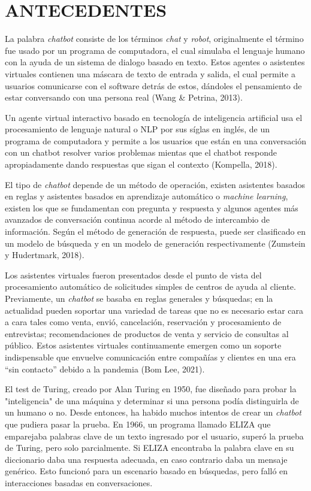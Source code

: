 \documentclass[letter, openright, 12pt]{book}
\begin{document}
\section{ANTECEDENTES}
La palabra \textit{chatbot} consiste de los términos \textit{chat} y \textit{robot}, originalmente el término fue usado por un programa de computadora, el cual simulaba el lenguaje humano con la ayuda de un sistema de dialogo basado en texto. Estos agentes o asistentes virtuales contienen una máscara de texto de entrada y salida, el cual permite a usuarios comunicarse con el software detrás de estos, dándoles el pensamiento de estar conversando con una persona real (Wang \& Petrina, 2013).\par 
Un agente virtual interactivo basado en tecnología de inteligencia artificial usa el procesamiento de lenguaje natural o NLP por sus síglas en inglés, de un programa de computadora y permite a los usuarios que están en una conversación con un chatbot resolver varios problemas mientas que el chatbot responde apropiadamente dando respuestas que sigan el contexto (Kompella, 2018).\par 
El tipo de \textit{chatbot} depende de un método de operación, existen asistentes basados en reglas y asistentes basados en aprendizaje automático o \textit{machine learning}, existen los que se fundamentan con pregunta y respuesta y algunos agentes más avanzados de conversación continua acorde al método de intercambio de información. Según el método de generación de respuesta, puede ser clasificado en un modelo de búsqueda y en un modelo de generación respectivamente (Zumstein y Hudertmark, 2018).\par 
Los asistentes virtuales fueron presentados desde el punto de vista del procesamiento automático de solicitudes simples de centros de ayuda al cliente. Previamente, un \textit{chatbot} se basaba en reglas generales y búsquedas; en la actualidad pueden soportar una variedad de tareas que no es necesario estar cara a cara tales como venta, envió, cancelación, reservación y procesamiento de entrevistas; recomendaciones de productos de venta y servicio de consultas al público. Estos asistentes virtuales continuamente emergen como un soporte indispensable que envuelve comunicación entre compañías y clientes en una era “sin contacto” debido a la pandemia (Bom Lee, 2021). \par 
El test de Turing, creado por Alan Turing en 1950, fue diseñado para probar la "inteligencia" de una máquina y determinar si una persona podía distinguirla de un humano o no. Desde entonces, ha habido muchos intentos de crear un \textit{chatbot} que pudiera pasar la prueba. En 1966, un programa llamado ELIZA que emparejaba palabras clave de un texto ingresado por el usuario, superó la prueba de Turing, pero solo parcialmente. Si ELIZA encontraba la palabra clave en su diccionario daba una respuesta adecuada, en caso contrario daba un mensaje genérico. Esto funcionó para un escenario basado en búsquedas, pero falló en interacciones basadas en conversaciones.\par
\end{document}
